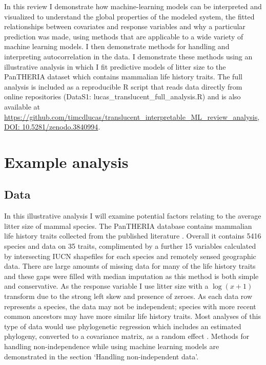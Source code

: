 \documentclass[12pt]{article}
\begin{document}
In this review I demonstrate how machine-learning models can be interpreted and visualized to understand the global properties of the modeled system, the fitted relationships between covariates and response variables and why a particular prediction was made, using methods that are applicable to a wide variety of machine learning models.
I then demonstrate methods for handling and interpreting autocorrelation in the data.
I demonstrate these methods using an illustrative analysis in which I fit predictive models of litter size to the PanTHERIA dataset \citep{jones2009pantheria} which contains mammalian life history traits.
The full analysis is included as a reproducible R \citep{R} script that reads data directly from online repositories (DataS1: lucas\_translucent\_full\_analysis.R) and is also available at \url{https://github.com/timcdlucas/translucent_interpretable_ML_review_analysis}, \url{DOI: 10.5281/zenodo.3840994}.

\section{Example analysis}\label{example-analysis}

\subsection{Data}\label{data}

In this illustrative analysis I will examine potential factors relating to the average litter size of mammal species.
The PanTHERIA database contains mammalian life history traits collected from the published literature \citep{jones2009pantheria}.
Overall it contains 5416 species and data on 35 traits, complimented by a further 15 variables calculated by intersecting IUCN shapefiles for each species and remotely sensed geographic data.
There are large amounts of missing data for many of the life history traits and these gaps were filled with median imputation as this method is both simple and conservative.
As the response variable I use litter size with a \(\log(x+1)\) transform due to the strong left skew and presence of zeroes.
As each data row represents a species, the data may not be independent; species with more recent common ancestors may have more similar life history traits.
Most analyses of this type of data \citep{felsenstein1985phylogenies, ives2006statistics, gay2014parasite, pellissier2012shifts, ferguson2014colony} would use phylogenetic regression which includes an estimated phylogeny, converted to a covariance matrix, as a random effect \citep{magnusson2017glmmtmb, caper}.
Methods for handling non-independence while using machine learning models are demonstrated in the section `Handling non-independent data'.
\end{document}
